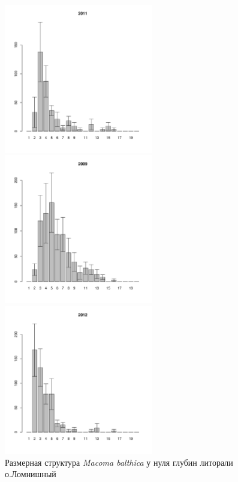 \begin{figure}[hp]
\begin{minipage}[b]{.46\linewidth}
\begin{center}
	\end{center}
	\end{minipage}
	\hfill
	\begin{minipage}[b]{.46\linewidth}
	\begin{center}
	\includegraphics[width=65mm]{../White_Sea/Lomnishniy/Lomnishniy_2011_.pdf}
	\end{center}
	\end{minipage}
%
	\begin{minipage}[b]{.46\linewidth}
	\begin{center}
	\includegraphics[width=65mm]{../White_Sea/Lomnishniy/Lomnishniy_2009_.pdf}
	\end{center}
	\end{minipage}
	\hfill
	\begin{minipage}[b]{.46\linewidth}
	\begin{center}
	\includegraphics[width=65mm]{../White_Sea/Lomnishniy/Lomnishniy_2012_.pdf}
	\end{center}
	\end{minipage}
%
\caption{Размерная структура {\it Macoma balthica} у нуля глубин литорали о.Ломнишный}
\label{ris:size_str_Lomnishniy}
\end{figure}


